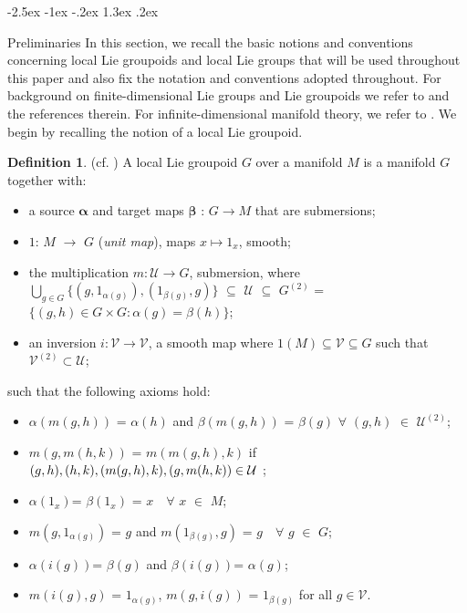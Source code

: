 \documentclass[12pt,a4paper]{amsart}
\makeatletter
\def\section{\@startsection{section}{1}{\z@}%
  {-2.5ex \@plus -1ex \@minus -.2ex}%
  {1.3ex \@plus.2ex}%
  {\normalfont\large\bfseries\raggedright}}
\theoremstyle{plain}
\theoremstyle{definition}
\newtheorem{definition}[theorem]{Definition}
\makeatother
\begin{document}
\section{Preliminaries}
In this section, we recall the basic notions and conventions concerning local Lie groupoids and local Lie groups that will be used throughout this paper and also fix the notation and conventions adopted throughout. For background on finite-dimensional Lie groups and Lie groupoids we refer to \cite{Lee, Mackenzie} and the references therein. For infinite-dimensional manifold theory, we refer to \cite{Schmeding1}. 
We begin by recalling the notion of a local Lie groupoid.
\begin{definition} (cf. \cite{Fernandes2})
 A local Lie groupoid $G$ over a manifold ${M}$ is a manifold $G$ together with:
 \begin{itemize}
 \small
     \item a source ${\mathbf{\alpha}}$ and target maps ${\mathbf{\beta}}$ : ${G}\rightarrow {M}$ that are submersions;
     \item ${1}$: ${M}$ $\rightarrow$ ${G}$ (\textit{unit map}), maps $x \mapsto 1_x$, smooth;
     \item the multiplication $m: \mathcal{U} \rightarrow G$, submersion, where\\$\bigcup_{g \in G}\{(g, 1_{\alpha(g)}), (1_{\beta(g)}, g)\}$ $\subseteq$ $\mathcal{U}$ $\subseteq$ $G^{(2)}$ = $\{(g,h) \in {G\times G} : {\alpha}(g)= {\beta}(h)\}$;
     \item an inversion $i: \mathcal{V} \rightarrow \mathcal{V}$, a smooth map where $1(M) \subseteq \mathcal{V} \subseteq G$ such that $\mathcal{V}^{(2)} \subset \mathcal{U}$;
 \end{itemize}
 such that the following axioms hold:

\begin{itemize}
\item $\alpha (m(g,h))$ = $\alpha(h)$ and $\beta(m(g,h))$ = $\beta(g)$ $\forall$ $(g,h)$ $\in$ ${\mathcal{U}^{(2)}}$;
\item $m(g,m(h,k))$ = $m(m(g,h),k)$  if $(g,h), (h,k), (m(g,h),k), \\(g, m(h,k)) \in \mathcal{U}$ ;

\item $\alpha(1_x)$= $\beta(1_x)$ = $x$ \,\, $\forall$ $x$ $\in$ ${M}$;

\item $m(g, 1_{\alpha(g)})$ = $g$ and  $ m(1_{\beta(g)},g)$ = $g$ \,\, $\forall$ $g$ $\in$ ${G}$;
\item $\alpha(i(g))$= $\beta(g)$ and $\beta(i(g))$= $\alpha(g)$;
\item $ m(i(g),g)$ = $ 1_{\alpha(g)}$, $m(g,i(g))$ =  $1_{\beta(g)}$ for all $g \in \mathcal{V}$.
\end{itemize}

\end{definition}
\end{document}

